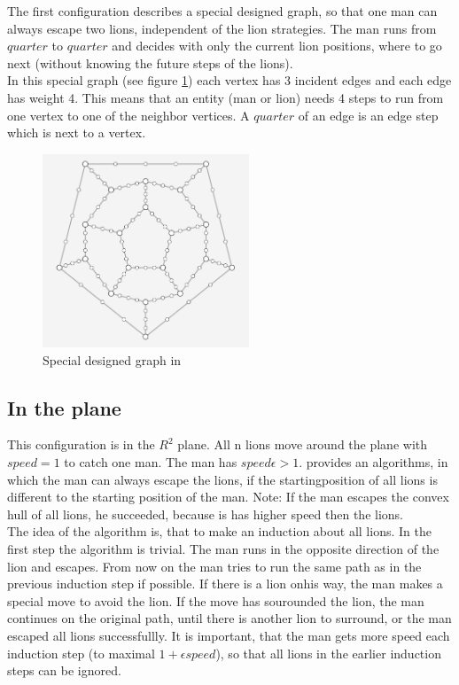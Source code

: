 \documentclass[a4paper]{article}
\begin{document}
The first configuration describes a special designed graph, so that one man can always escape two lions, independent of the lion strategies. The man runs from $quarter$ to $quarter$  and decides with only the current lion positions, where to go next (without knowing the future steps of the lions).\\
In this special graph (see figure \ref{fig:specialGraph}) each vertex has 3 incident edges and each edge has weight 4. This means that an entity (man or lion) needs 4 steps to run from one vertex to one of the neighbor vertices. A $quarter$ of an edge is an edge step which is next to a vertex. 

\begin{figure}[hbt]
  \centering
    \includegraphics[width=0.55\textwidth]{specialGraph.PNG}
  \caption{Special designed graph in \cite{paper}}
  \label{fig:specialGraph}
\end{figure}

\subsection{In the plane}
This configuration is in the $R^2$ plane. All n lions move around the plane with $speed = 1$ to catch one man. The man has $speed \epsilon > 1$.
\cite{paper} provides an algorithms, in which the man can always escape the lions, if the startingposition of all lions is different to the starting position of the man. Note: If the man escapes the convex hull of all lions, he succeeded, because is has higher speed then the lions.\\
The idea of the algorithm is, that to make an induction about all lions. In the first step the algorithm is trivial. The man runs in the opposite direction of the lion and escapes. From now on the man tries to run the same path as in the previous induction step if possible. If there is a lion onhis way, the man makes a special move to avoid the lion. If the move has sourounded the lion, the man continues on the original path, until there is another lion to surround, or the man escaped all lions successfullly. It is important, that the man gets more speed each induction step (to maximal $1 + \epsilon speed$), so that all lions in the earlier induction steps can be ignored.
\end{document}
